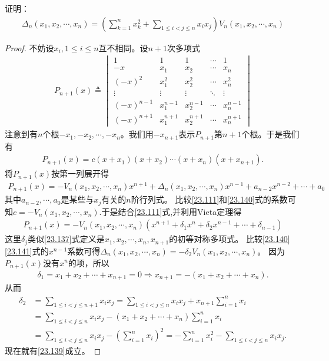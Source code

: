 \documentclass[../../main.tex]{subfiles}%
\begin{document}
\begin{example}
证明：
\begin{align}
\Delta_n(x_1,x_2,\cdots,x_n)=\left(\sum_{k = 1}^n x_k^2+\sum_{1\leqslant  i<j\leqslant  n}x_ix_j\right)V_n(x_1,x_2,\cdots,x_n) \label{23.139}
\end{align} 
\end{example}
\begin{proof}
不妨设\(x_i,1\leqslant  i\leqslant  n\)互不相同。设\(n + 1\)次多项式
\begin{align*}
P_{n + 1}(x)\triangleq\begin{vmatrix}
1&1&1&\cdots&1\\
-x&x_1&x_2&\cdots&x_n\\
(-x)^2&x_1^2&x_2^2&\cdots&x_n^2\\
\vdots&\vdots&\vdots&\ddots&\vdots\\
(-x)^{n - 1}&x_1^{n - 1}&x_2^{n - 1}&\cdots&x_n^{n - 1}\\
(-x)^{n + 1}&x_1^{n + 1}&x_2^{n + 1}&\cdots&x_n^{n + 1}
\end{vmatrix}
\end{align*}
注意到有\(n\)个根\(-x_1,-x_2,\cdots,-x_n\)。我们用\(-x_{n + 1}\)表示\(P_{n + 1}\)第\(n + 1\)个根。于是我们有
\begin{align}
P_{n + 1}(x)=c(x + x_1)(x + x_2)\cdots(x + x_n)(x + x_{n + 1}).\label{23.111}
\end{align}
将\(P_{n + 1}(x)\)按第一列展开得
\begin{align}\label{23.140}
P_{n + 1}(x)=-V_n(x_1,x_2,\cdots,x_n)x^{n + 1}+\Delta_n(x_1,x_2,\cdots,x_n)x^{n - 1}+a_{n - 2}x^{n - 2}+\cdots+a_0
\end{align}
其中\(a_{n - 2},\cdots,a_0\)是某些与\(x_j\)有关的\(n\)阶行列式。
比较\eqref{23.111}和\eqref{23.140}式的系数可知\(c = -V_n(x_1,x_2,\cdots,x_n)\).于是结合\eqref{23.111}式,并利用Vieta定理得
\begin{align}\label{23.141}
P_{n + 1}(x)=-V_n(x_1,x_2,\cdots,x_n)(x^{n + 1}+\delta_1x^n+\delta_2x^{n - 1}+\cdots+\delta_{n - 1})
\end{align}
这里\(\delta_j\)类似\eqref{23.137}式定义是\(x_1,x_2,\cdots,x_n,x_{n + 1}\)的初等对称多项式。
比较\eqref{23.140}\eqref{23.141}式的\(x^{n - 1}\)系数可得\(\Delta_n(x_1,x_2,\cdots,x_n)=-\delta_2V_n(x_1,x_2,\cdots,x_n)\)。
因为\(P_{n + 1}(x)\)没有\(x^n\)的项，所以
\begin{align*}
\delta _1=x_1+x_2+\cdots +x_{n+1}=0\Rightarrow x_{n+1}=-\left( x_1+x_2+\cdots +x_n \right) .
\end{align*}
从而
\begin{align*}
\delta _2&=\sum_{1\leqslant i<j\leqslant n+1}{x_ix_j}=\sum_{1\leqslant i<j\leqslant n}{x_ix_j}+x_{n+1}\sum_{i=1}^n{x_i}
\\
&=\sum_{1\leqslant i<j\leqslant n}{x_ix_j}-\left( x_1+x_2+\cdots +x_n \right) \sum_{i=1}^n{x_i}
\\
&=\sum_{1\leqslant i<j\leqslant n}{x_ix_j}-\left( \sum_{i=1}^n{x_i} \right) ^2=-\sum_{i=1}^n{x_{i}^{2}}-\sum_{1\leqslant i<j\leqslant n}{x_ix_j}.
\end{align*}
现在就有\eqref{23.139}成立。 
\end{proof}
\end{document}
